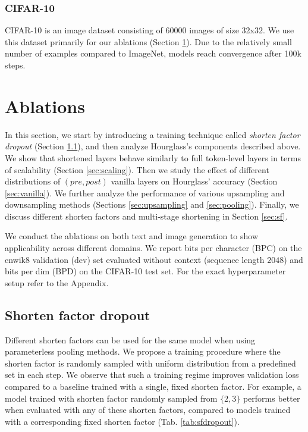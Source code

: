 \documentclass[11pt]{article}
\begin{document}
\subsubsection{CIFAR-10} 
CIFAR-10 \cite{Krizhevsky09learningmultiple} is an image dataset consisting of 60000 images of size 32x32. We use this dataset primarily for our ablations (Section \ref{sec:ablation}). Due to the relatively small number of examples compared to ImageNet, models reach convergence after 100k steps.

\setlength{\textfloatsep}{0.5em}
\section{Ablations}\label{sec:ablation}
In this section, we start by introducing a training technique called \emph{shorten factor dropout} (Section \ref{sec:sfdropout}), and then analyze Hourglass's components described above. We show that shortened layers behave similarly to full token-level layers in terms of scalability (Section \ref{sec:scaling}). Then we study the effect of different distributions of $(pre, post)$ vanilla layers on Hourglass' accuracy (Section \ref{sec:vanilla}). We further analyze the performance of various upsampling and downsampling methods (Sections \ref{sec:upsampling} and \ref{sec:pooling}). Finally, we discuss different shorten factors and multi-stage shortening in Section \ref{sec:sf}. 

We conduct the ablations on both text and image generation to show applicability across different domains.
We report bits per character (BPC) on the enwik8 validation (dev) set evaluated without context (sequence length $2048$) and bits per dim (BPD) on the CIFAR-10 test set.
For the exact hyperparameter setup refer to the Appendix.

\subsection{Shorten factor dropout}\label{sec:sfdropout}

Different shorten factors can be used for the same model when using parameterless pooling methods. We propose a training procedure where the shorten factor is randomly sampled with uniform distribution from a predefined set in each step. We observe that such a training regime improves validation loss compared to a baseline trained with a single, fixed shorten factor.
For example, a model trained with shorten factor randomly sampled from $\{2,3\}$ performs better when evaluated with any of these shorten factors, compared to models trained with a corresponding fixed shorten factor (Tab. \ref{tab:sfdropout}).
\end{document}
